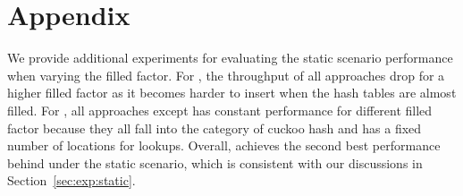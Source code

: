 

\section*{Appendix}
We provide additional experiments for evaluating the static scenario performance when varying the filled factor. 
For , the throughput of all approaches drop for a higher filled factor as it becomes harder to insert when the hash tables are almost filled.
For , all approaches except \linear has constant performance for different filled factor because they all fall into the category of cuckoo hash and has a fixed number of locations for lookups. 
Overall, \voter achieves the second best performance behind \megakv under the static scenario, which is consistent with our discussions in Section~\ref{sec:exp:static}.

